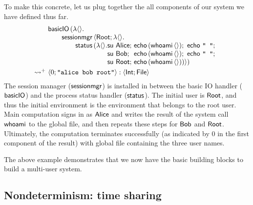 \documentclass[12pt,phd,lfcs,twoside,openright,logo,leftchapter,normalheadings]{infthesis}
\theoremstyle{plain}
\theoremstyle{definition}
\begin{document}
To make this concrete, let us plug together the all components of our
system we have defined thus far.
%
\[
  \ba{@{~}l@{~}l}
    &\bl
      \basicIO\,(\lambda\Unit.\\
         \qquad\sessionmgr\,\Record{\Root;\lambda\Unit.\\
           \qquad\qquad\status\,(\lambda\Unit.
            \ba[t]{@{}l@{~}l}
              \su~\Alice;&\echo\,(\whoami\,\Unit);~\echo~\strlit{ };\\
              \su~\Bob;  &\echo\,(\whoami\,\Unit);~\echo~\strlit{ };\\
              \su~\Root; &\echo\,(\whoami\,\Unit))})
            \ea
     \el \smallskip\\
   \reducesto^+& \Record{0;\strlit{alice bob root}} : \Record{\Int;\UFile}
 \ea
\]
%
The session manager ($\mathsf{sessionmgr}$) is installed in between the basic
IO handler ($\mathsf{basicIO}$) and the process status handler
($\mathsf{status}$). The initial user is $\mathsf{Root}$, and thus the initial
environment is the environment that belongs to the root user. Main
computation signs in as $\mathsf{Alice}$ and writes the result of the system
call $\mathsf{whoami}$ to the global file, and then repeats these steps for
$\mathsf{Bob}$ and $\mathsf{Root}$.
%
Ultimately, the computation terminates successfully (as indicated by
$0$ in the first component of the result) with global file containing
the three user names.
%

The above example demonstrates that we now have the basic building
blocks to build a multi-user system.
%

\subsection{Nondeterminism: time sharing}
\label{sec:tiny-unix-time}
\end{document}
